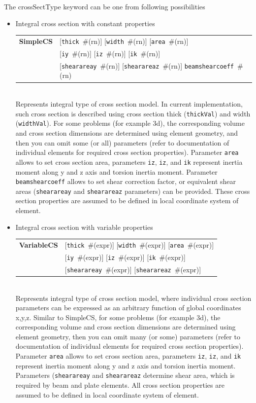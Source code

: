 \documentclass[a4paper]{article}
\makeatletter
\newcommand{\param}[1]{\texttt{#1}} %
\newcommand{\optional}[1]{[#1]} %
\newcommand{\field}[2]{\param{#1}~\#{\tiny(#2)}} %
\newcommand{\optField}[2]{\optional{\field{#1}{#2}}}
\newcommand{\entKeywordInst}[1]{\textbf{#1}} %
\newenvironment{record}[1][]{\begin{tabular}{|ll}}{\end{tabular}\\}
\newcommand{\recentry}[2]{{#1}&{#2}\\}
\newcounter{rcc}
\newenvironment{record}[1][\textwidth]{\setcounter{rcc}{0}\begin{tabular*}{#1}{|ll@{\extracolsep{\fill}}r}}{\end{tabular*}\\}
\newcommand{\recentry}[2]{\ifthenelse{\value{rcc}>0}{&$\backslash$ \\}{\setcounter{rcc}{1}}{#1}&{#2}}
\makeatother
\begin{document}
The crossSectType keyword can be one from following possibilities
\begin{itemize}
\item 
Integral cross section with constant properties\\
\begin{record}[0.9\textwidth]
  \recentry{\entKeywordInst{SimpleCS}}{\optField{thick}{rn} \optField{width}{rn} \optField{area}{rn}}
  \recentry{}{\optField{iy}{rn} \optField{iz}{rn} \optField{ik}{rn}}
  \recentry{}{\optField{shearareay}{rn} \optField{shearareaz}{rn} \field{beamshearcoeff}{rn}}
\end{record}
Represents integral type of cross section model. In current
implementation, such cross section is described using cross section
thick (\param{thickVal}) and width (\param{widthVal}). For some
problems (for example 3d), the corresponding volume and cross section dimensions are
determined using element geometry, and then you can omit some (or all) parameters (refer to documentation of individual elements for required cross section properties). Parameter \param{area} allows to set cross section area, parameters \param{iz}, \param{iz}, and \param{ik} represent 
inertia moment along y and z axis and torsion inertia moment. Parameter \param{beamshearcoeff} allows to set shear correction factor, or equivalent 
shear areas (\param{shearareay} and \param{shearareaz} parameters) can be provided. 
These cross section properties are assumed to be defined in local coordinate system of element.\\

\item
Integral cross section with variable properties\\
\begin{record}[0.9\textwidth]
  \recentry{\entKeywordInst{VariableCS}}{\optField{thick}{expr} \optField{width}{expr} \optField{area}{expr}}
  \recentry{}{\optField{iy}{expr} \optField{iz}{expr} \optField{ik}{expr}}
  \recentry{}{\optField{shearareay}{expr} \optField{shearareaz}{expr} }
\end{record}
Represents integral type of cross section model, where individual cross section parameters can be expressed as an arbitrary function of global coordinates x,y,z. Similar to SimpleCS, for some problems (for example 3d), the corresponding volume and cross section dimensions are
determined using element geometry, then you can omit many (or some) parameters (refer to documentation of individual elements for required cross section properties). 
Parameter \param{area} allows to set cross section area, parameters \param{iz}, \param{iz}, and \param{ik} represent 
inertia moment along y and z axis and torsion inertia moment. Parameters (\param{shearareay} and \param{shearareaz} determine shear area, which is required by beam and plate elements. All cross section properties are assumed to be defined in local coordinate system of element.\\


\end{itemize}
\end{document}
